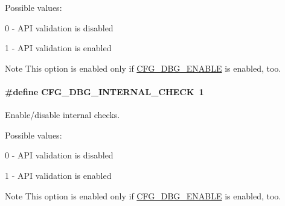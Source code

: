 Possible values\-:
\begin{DoxyItemize}
\item 0 -\/ A\-P\-I validation is disabled
\item 1 -\/ A\-P\-I validation is enabled \begin{DoxyNote}{Note}
This option is enabled only if \hyperlink{group__dbg__cfg_ga2ee37a5fa7efdba7d0014328e6c623a8}{C\-F\-G\-\_\-\-D\-B\-G\-\_\-\-E\-N\-A\-B\-L\-E} is enabled, too. 
\end{DoxyNote}

\end{DoxyItemize}\hypertarget{group__dbg__cfg_ga530daa344716eca7cf87075dd7a8fca1}{
\paragraph[{C\-F\-G\-\_\-\-D\-B\-G\-\_\-\-I\-N\-T\-E\-R\-N\-A\-L\-\_\-\-C\-H\-E\-C\-K}]{\setlength{\rightskip}{0pt plus 5cm}\#define C\-F\-G\-\_\-\-D\-B\-G\-\_\-\-I\-N\-T\-E\-R\-N\-A\-L\-\_\-\-C\-H\-E\-C\-K~1}}\label{group__dbg__cfg_ga530daa344716eca7cf87075dd7a8fca1}


Enable/disable internal checks. 

Possible values\-:
\begin{DoxyItemize}
\item 0 -\/ A\-P\-I validation is disabled
\item 1 -\/ A\-P\-I validation is enabled \begin{DoxyNote}{Note}
This option is enabled only if \hyperlink{group__dbg__cfg_ga2ee37a5fa7efdba7d0014328e6c623a8}{C\-F\-G\-\_\-\-D\-B\-G\-\_\-\-E\-N\-A\-B\-L\-E} is enabled, too. 
\end{DoxyNote}

\end{DoxyItemize}